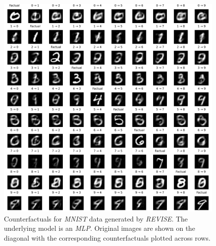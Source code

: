 \begin{figure}
  \centering
  \includegraphics[width=1.0\linewidth]{../www/mnist_all_mlp_revise.png}
  \caption{Counterfactuals for \textit{MNIST} data generated by \textit{REVISE}. The underlying model is an \textit{MLP}. Original images are shown on the diagonal with the corresponding counterfactuals plotted across rows.}\label{fig:mnist-revise-mlp}
\end{figure}

